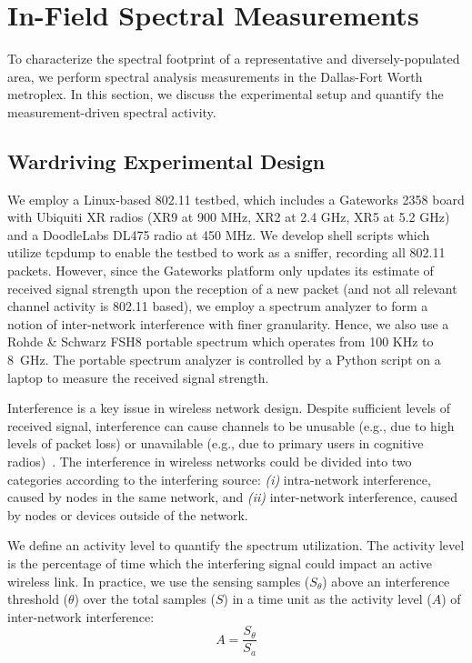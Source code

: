 \section{In-Field Spectral Measurements}
\label{sec:measurements}

To characterize the spectral footprint of a representative and diversely-populated area, 
we perform spectral analysis measurements in the Dallas-Fort Worth metroplex. In this section, 
we discuss the experimental setup and quantify the measurement-driven spectral activity.
 
\subsection{Wardriving Experimental Design}
\label{subsec:measurementdesign}
We employ a Linux-based 802.11 testbed, which includes a Gateworks 2358 board with Ubiquiti XR radios 
(XR9 at 900 MHz, XR2 at 2.4 GHz, XR5 at 5.2 GHz) and a DoodleLabs DL475 radio at 450 MHz. We develop 
shell scripts which utilize tcpdump to enable the testbed to work as a sniffer, recording all 802.11 
packets. However, since the Gateworks platform only updates its estimate of received signal strength 
upon the reception of a new packet (and not all relevant channel activity is 802.11 based), we employ 
a spectrum analyzer to form a notion of inter-network interference with finer granularity.  Hence, we 
also use a Rohde \& Schwarz FSH8 portable spectrum which operates from 100 KHz to 8~GHz. The portable spectrum 
analyzer is controlled by a Python script on a laptop to measure the received signal strength.


Interference is a key issue in wireless network design. Despite sufficient levels of received signal, 
interference can cause channels to be unusable (e.g., due to high levels of packet loss) or unavailable 
(e.g., due to primary users in cognitive radios)~\cite{haykin2005cognitive}. 
The interference in wireless networks could be divided into two categories according to the interfering 
source: {\it (i)} intra-network interference, caused by nodes in the same network, and {\it (ii)} 
inter-network interference, caused by nodes or devices outside of the network. 

We define an activity level to quantify the spectrum utilization. The activity level is the percentage 
of time which the interfering signal could impact an active wireless link. In practice, we use the sensing 
samples ($S_\theta$) above an interference threshold ($\theta$) over the total samples ($S$) in a time 
unit as the activity level ($A$) of inter-network interference:
\begin{equation}
\label{eq:actdef}
A=\frac{S_\theta}{S_a}
\end{equation}



